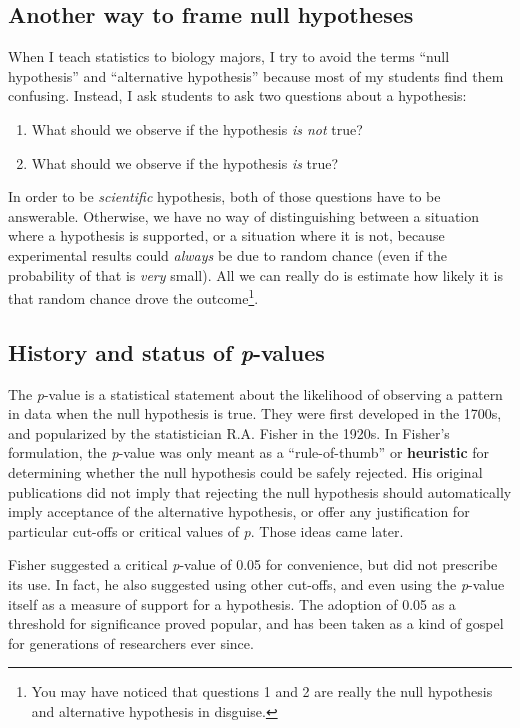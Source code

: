 \documentclass[
  13,
  letterpaper,
]{report}
\begin{document}
\subsection{Another way to frame null
hypotheses}\label{sec-intro-pvals-alt}

When I teach statistics to biology majors, I try to avoid the terms
``null hypothesis'' and ``alternative hypothesis'' because most of my
students find them confusing. Instead, I ask students to ask two
questions about a hypothesis:

\begin{enumerate}
\def\labelenumi{\arabic{enumi}.}
\item
  What should we observe if the hypothesis \emph{is not} true?
\item
  What should we observe if the hypothesis \emph{is} true?
\end{enumerate}

In order to be \emph{scientific} hypothesis, both of those questions
have to be answerable. Otherwise, we have no way of distinguishing
between a situation where a hypothesis is supported, or a situation
where it is not, because experimental results could \emph{always} be due
to random chance (even if the probability of that is \emph{very} small).
All we can really do is estimate how likely it is that random chance
drove the outcome\footnote{You may have noticed that questions 1 and 2
  are really the null hypothesis and alternative hypothesis in disguise.}.

\subsection{\texorpdfstring{History and status of
\emph{p}-values}{History and status of p-values}}\label{sec-intro-pvals-hist}

The \emph{p}-value is a statistical statement about the likelihood of
observing a pattern in data when the null hypothesis is true. They were
first developed in the 1700s, and popularized by the statistician R.A.
Fisher in the 1920s. In Fisher's formulation, the \emph{p}-value was
only meant as a ``rule-of-thumb'' or \textbf{heuristic} for determining
whether the null hypothesis could be safely rejected. His original
publications did not imply that rejecting the null hypothesis should
automatically imply acceptance of the alternative hypothesis, or offer
any justification for particular cut-offs or critical values of
\emph{p}. Those ideas came later.

Fisher suggested a critical \emph{p}-value of 0.05 for convenience, but
did not prescribe its use. In fact, he also suggested using other
cut-offs, and even using the \emph{p}-value itself as a measure of
support for a hypothesis. The adoption of 0.05 as a threshold for
significance proved popular, and has been taken as a kind of gospel for
generations of researchers ever since.
\end{document}
